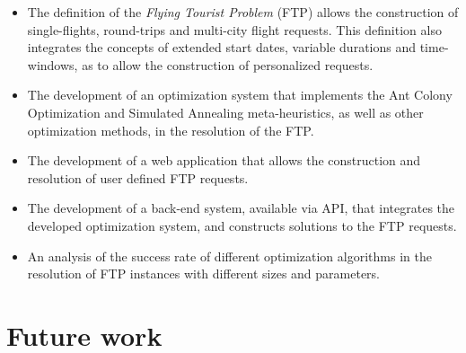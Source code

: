 \begin{itemize}
    \item 
    
    The definition of the \textit{Flying Tourist Problem} (FTP) allows the construction of single-flights, round-trips and multi-city flight requests. This definition also integrates the concepts of extended start dates, variable durations and time-windows, as to allow the construction of personalized requests. 
    
    \item The development of an optimization system that implements the Ant Colony Optimization and Simulated Annealing meta-heuristics, as well as other optimization methods, in the resolution of the FTP.
    
    \item 
    The development of a web application that allows the construction and resolution of user defined FTP requests.  

    \item The development of a back-end system, available via API, that integrates the developed optimization system, and constructs solutions to the FTP requests.
    
    \item 
    An analysis of the success rate of different optimization algorithms in the resolution of FTP instances with different sizes and parameters.

\end{itemize}

\section{Future work}



